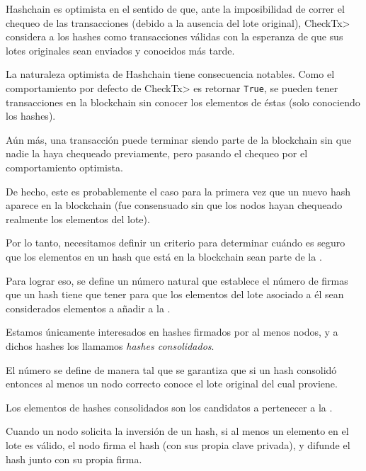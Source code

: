 %
Hashchain es optimista en el sentido de que, ante la imposibilidad de correr el chequeo
de las transacciones (debido a la ausencia del lote original), \<CheckTx> considera a los
hashes como transacciones válidas con la esperanza de que sus lotes originales sean enviados
y conocidos más tarde. 

%
La naturaleza optimista de Hashchain tiene consecuencia notables.
%
Como el comportamiento por defecto de  \<CheckTx> es retornar \texttt{True},
se pueden tener transacciones en la blockchain sin conocer los elementos de éstas
(solo conociendo los hashes).

%
Aún más, una transacción puede terminar siendo parte de la blockchain sin que nadie
la haya chequeado previamente, pero pasando el chequeo por el comportamiento optimista.
%

De hecho, este es probablemente el caso para la primera vez que un nuevo hash aparece
en la blockchain (fue consensuado sin que los nodos hayan chequeado realmente los elementos
del lote).

%

Por lo tanto, necesitamos definir un criterio para determinar cuándo es seguro
que los elementos en un hash que está en la blockchain sean parte de la \setchain.

%
Para lograr eso, se define un número natural \SPH que establece
el número de firmas que un hash tiene que tener para que los elementos del lote asociado a él
sean considerados elementos a añadir a la \setchain.

%
Estamos únicamente interesados en hashes firmados por al menos \SPH
nodos, y a dichos hashes los llamamos \textit{hashes consolidados}.

El número \SPH se define de manera tal que se garantiza que si un hash
consolidó entonces al menos un nodo correcto conoce el lote original del cual proviene.

%
Los elementos de hashes consolidados son los candidatos a pertenecer a la \setchain.

%
Cuando un nodo solicita la inversión de un hash, si al menos un elemento en el lote
es válido, el nodo firma el hash (con sus propia clave privada), y difunde el hash junto
con su propia firma.

